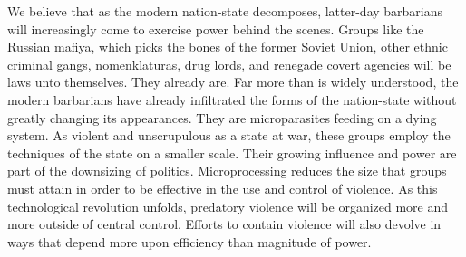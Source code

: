 \begin{paracol}{2}[]
\switchcolumn
We believe that as the modern nation-state decomposes, latter-day barbarians will increasingly come to exercise power behind the scenes. Groups like the Russian mafiya, which picks the bones of the former Soviet Union, other ethnic criminal gangs, nomenklaturas, drug lords, and renegade covert agencies will be laws unto themselves. They already are. Far more than is widely understood, the modern barbarians have already infiltrated the forms of the nation-state without greatly changing its appearances. They are microparasites feeding on a dying system. As violent and unscrupulous as a state at war, these groups employ the techniques of the state on a smaller scale. Their growing influence and power are part of the downsizing of politics. Microprocessing reduces the size that groups must attain in order to be effective in the use and control of violence. As this technological revolution unfolds, predatory violence will be organized more and more outside of central control. Efforts to contain violence will also devolve in ways that depend more upon efficiency than magnitude of power.
\end{paracol}


